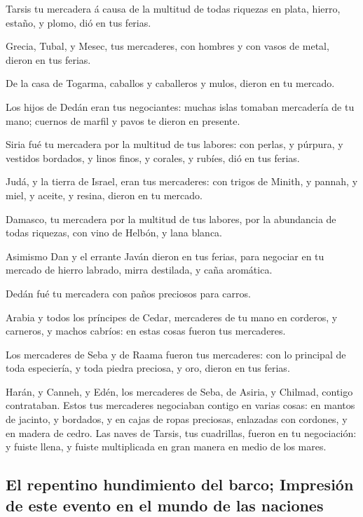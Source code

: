  Tarsis tu mercadera á causa de la multitud de todas
riquezas en plata, hierro, estaño, y plomo, dió en tus ferias.

 Grecia, Tubal, y Mesec, tus mercaderes, con hombres y
con vasos de metal, dieron en tus ferias.

 De la casa de Togarma, caballos y caballeros y mulos,
dieron en tu mercado.

 Los hijos de Dedán eran tus negociantes: muchas islas
tomaban mercadería de tu mano; cuernos de marfil y pavos te dieron en
presente.

 Siria fué tu mercadera por la multitud de tus labores:
con perlas, y púrpura, y vestidos bordados, y linos finos, y corales, y
rubíes, dió en tus ferias.

 Judá, y la tierra de Israel, eran tus mercaderes: con
trigos de Minith, y pannah, y miel, y aceite, y resina, dieron en tu
mercado.

 Damasco, tu mercadera por la multitud de tus labores,
por la abundancia de todas riquezas, con vino de Helbón, y lana blanca.

 Asimismo Dan y el errante Javán dieron en tus ferias,
para negociar en tu mercado de hierro labrado, mirra destilada, y caña
aromática.

 Dedán fué tu mercadera con paños preciosos para carros.

 Arabia y todos los príncipes de Cedar, mercaderes de tu
mano en corderos, y carneros, y machos cabríos: en estas cosas fueron
tus mercaderes.

 Los mercaderes de Seba y de Raama fueron tus mercaderes:
con lo principal de toda especiería, y toda piedra preciosa, y oro,
dieron en tus ferias.

 Harán, y Canneh, y Edén, los mercaderes de Seba, de
Asiria, y Chilmad, contigo contrataban.  Estos tus
mercaderes negociaban contigo en varias cosas: en mantos de jacinto, y
bordados, y en cajas de ropas preciosas, enlazadas con cordones, y en
madera de cedro.  Las naves de Tarsis, tus cuadrillas,
fueron en tu negociación: y fuiste llena, y fuiste multiplicada en gran
manera en medio de los mares.

\hypertarget{el-repentino-hundimiento-del-barco-impresiuxf3n-de-este-evento-en-el-mundo-de-las-naciones}{%
\subsection{El repentino hundimiento del barco; Impresión de este evento
en el mundo de las
naciones}\label{el-repentino-hundimiento-del-barco-impresiuxf3n-de-este-evento-en-el-mundo-de-las-naciones}}

